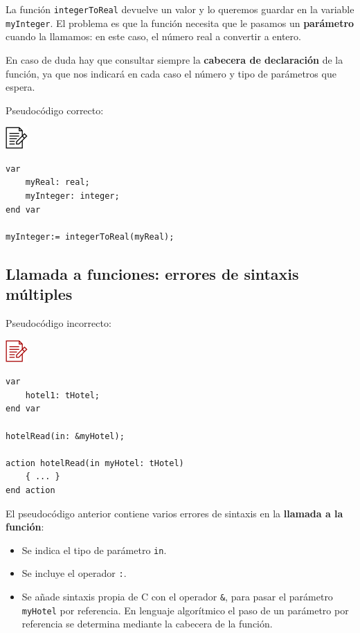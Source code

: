 \documentclass[
]{book}
\providecommand{\tightlist}{%
  \setlength{\itemsep}{0pt}\setlength{\parskip}{0pt}}
\begin{document}
La función \texttt{integerToReal} devuelve un valor y lo queremos guardar en la variable \texttt{myInteger}. El problema es que la función necesita que le pasamos un \textbf{parámetro} cuando la llamamos: en este caso, el número real a convertir a entero.

En caso de duda hay que consultar siempre la \textbf{cabecera de declaración} de la función, ya que nos indicará en cada caso el número y tipo de parámetros que espera.

Pseudocódigo correcto:

\includegraphics{./img/alg.png}

\begin{verbatim}
var
    myReal: real;
    myInteger: integer;
end var

myInteger:= integerToReal(myReal);
\end{verbatim}

\hypertarget{llamada-a-funciones-errores-de-sintaxis-muxfaltiples}{%
\subsection{Llamada a funciones: errores de sintaxis múltiples}\label{llamada-a-funciones-errores-de-sintaxis-muxfaltiples}}

Pseudocódigo incorrecto:

\includegraphics{./img/alg_err.png}

\begin{verbatim}
var
    hotel1: tHotel;
end var

hotelRead(in: &myHotel);

action hotelRead(in myHotel: tHotel)
    { ... }
end action
\end{verbatim}

El pseudocódigo anterior contiene varios errores de sintaxis en la \textbf{llamada a la función}:

\begin{itemize}
\tightlist
\item
  Se indica el tipo de parámetro \texttt{in}.
\item
  Se incluye el operador \texttt{:}.
\item
  Se añade sintaxis propia de C con el operador \texttt{\&}, para pasar el parámetro \texttt{myHotel} por referencia. En lenguaje algorítmico el paso de un parámetro por referencia se determina mediante la cabecera de la función.
\end{itemize}
\end{document}
